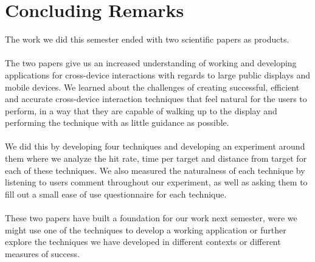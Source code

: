 \section*{Concluding Remarks}

The work we did this semester ended with two scientific papers as products. \\\\
The two papers give us an increased understanding of working and developing applications for cross-device interactions with regards to large public displays and mobile devices.
We learned about the challenges of creating successful, efficient and accurate cross-device interaction techniques that feel natural for the users to perform, in a way that they are capable of walking up to the display and performing the technique with as little guidance as possible. \\\\
We did this by developing four techniques and developing an experiment around them where we analyze the hit rate, time per target and distance from target for each of these techniques.
We also measured the naturalness of each technique by listening to users comment throughout our experiment, as well as asking them to fill out a small ease of use questionnaire for each technique. \\\\
These two papers have built a foundation for our work next semester, were we might use one of the techniques to develop a working application or further explore the techniques we have developed in different contexts or different measures of success. 